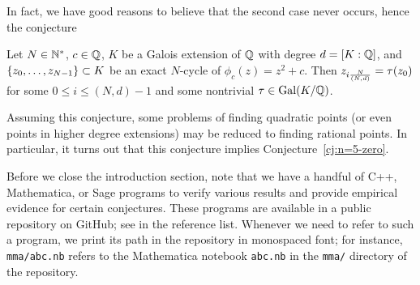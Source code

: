 In fact, we have good reasons to believe that the second case never
occurs, hence the conjecture

\begin{conjecture}
  \label{cj:galois-conjugate}
  Let $N \in \mathbb{N}^*$, $c \in \mathbb{Q}$, $K$ be a Galois extension of $\mathbb{Q}$ with
  degree $d = [K : \mathbb{Q}]$, and $\left\{z_0, \dots, z_{N-1}\right\} \subset K$ be
  an exact $N$-cycle of $\phi_c(z) = z^2 + c$. Then $z_{i\frac{N}{(N, d)}} =
  \tau(z_0)$ for some $0 \le i \le (N, d)-1$ and some nontrivial $\tau \in
  \mathrm{Gal}(K/\mathbb{Q})$.
\end{conjecture}

Assuming this conjecture, some problems of finding quadratic points
(or even points in higher degree extensions) may be reduced to finding
rational points. In particular, it turns out that this conjecture
implies Conjecture~\ref{cj:n=5-zero}.

Before we close the introduction section, note that we have a handful
of C++, Mathematica, or Sage programs to verify various results and
provide empirical evidence for certain conjectures. These programs are
available in a public repository on GitHub; see \cite{src} in the
reference list. Whenever we need to refer to such a program, we print
its path in the repository in monospaced font; for instance,
\texttt{mma/abc.nb} refers to the Mathematica notebook \texttt{abc.nb}
in the \texttt{mma/} directory of the repository.


